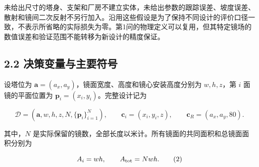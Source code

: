 \documentclass[UTF8,fontset=windows,zihao=-4]{ctexart}
\begin{document}
未给出尺寸的塔身、支架和厂房不建立实体，未给出参数的跟踪误差、坡度误差、散射和镜间二次反射不另行加入。沿用这些假设是为了保持不同设计的评价口径一致，不表示所省略的实际损失为零。第1问的物理定义可以复用，但其特定镜场的数值误差和验证范围不能转移为新设计的精度保证。

\subsection*{2.2 决策变量与主要符号}

\par\noindent\begin{minipage}{\linewidth}
设塔位为 \(\boldsymbol a=(a_x,a_y)\)，镜面宽度、高度和镜心安装高度分别为 \(w,h,z\)，第 \(i\) 面镜的平面位置为 \(\boldsymbol p_i=(x_i,y_i)\)。完整设计记为

\[
\mathcal D=
\left(\boldsymbol a,w,h,z,N,\{\boldsymbol p_i\}_{i=1}^{N}\right),
\qquad
\boldsymbol c_i=(x_i,y_i,z),\qquad
\boldsymbol c_R=(a_x,a_y,80).
\tag{1}
\]
\end{minipage}\par

\par\noindent\begin{minipage}{\linewidth}
其中，\(N\) 是实际保留的镜数，全部长度以米计。所有镜面的共同面积和总镜面面积分别为

\[
A_i=wh,\qquad A_{\rm tot}=Nwh.
\tag{2}
\]
\end{minipage}\par
\end{document}
